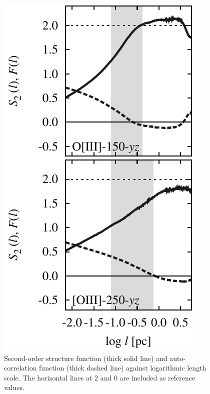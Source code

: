 \documentclass[useAMS,usenatbib]{mn2e}
\begin{document}
\begin{figure}
  \centering
  \includegraphics[width=0.8\linewidth]{auto-yz-15-25-O3}
  \caption{Second-order structure function (thick solid line) and auto-correlation
    function (thick dashed line) against logarithmic length scale. The
    horizontal lines at 2 and 0 are included as reference values.}
\label{fig:sfauto}
\end{figure}
\end{document}
